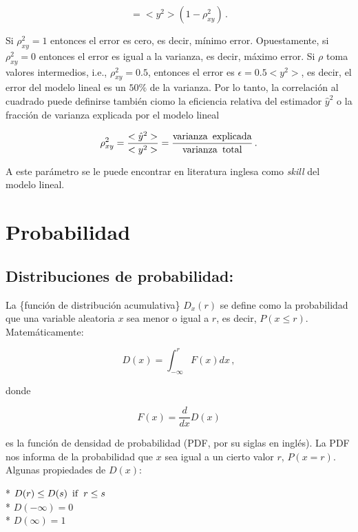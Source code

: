 \documentclass[
]{agujournal2019}
\begin{document}
\[=<y^2>(1-\rho^2_{xy})\,.\]

Si \(\rho^2_{xy}=1\) entonces el error es cero, es decir, mínimo error.
Opuestamente, si \(\rho^2_{xy}=0\) entonces el error es igual a la
varianza, es decir, máximo error. Si \(\rho\) toma valores intermedios,
i.e., \(\rho^2_{xy}=0.5\), entonces el error es \(\epsilon=0.5<y^2>\),
es decir, el error del modelo lineal es un \(50\%\) de la varianza. Por
lo tanto, la correlación al cuadrado puede definirse también ciomo la
eficiencia relativa del estimador \(\hat{y}^2\) o la fracción de
varianza explicada por el modelo lineal

\[\rho^2_{xy}=\frac{<\hat{y}^2>}{<y^2>}=\frac{{\rm varianza\,\,\,explicada}}{{\rm varianza\,\,\,total}}\,.\]

A este parámetro se le puede encontrar en literatura inglesa como
\emph{skill} del modelo lineal.

\hypertarget{probabilidad}{%
\section{Probabilidad}\label{probabilidad}}

\vspace{0.5cm}

\hypertarget{distribuciones-de-probabilidad}{%
\subsection{Distribuciones de
probabilidad:}\label{distribuciones-de-probabilidad}}

La \{función de distribución acumulativa\} \(D_x(r)\) se define como la
probabilidad que una variable aleatoria \(x\) sea menor o igual a \(r\),
es decir, \(P(x\le r)\). Matemáticamente:

\[D(x)=\int^r_{-\infty}F(x)dx\,,\]

donde

\[F(x)=\frac{d}{dx} D(x)\]

es la función de densidad de probabilidad (PDF, por su siglas en
inglés). La PDF nos informa de la probabilidad que \(x\) sea igual a un
cierto valor \(r\), \(P(x=r)\).\\

Algunas propiedades de \(D(x)\):

\hfill\break
* \(D(r)\le D(s)\,\,\,{\rm if}\,\,\,r\le s\)\\
* \(D(-\infty)=0\)\\
* \(D(\infty)=1\)\\
\end{document}
